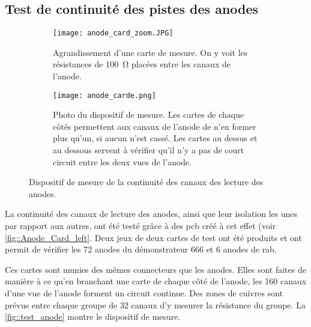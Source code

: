         \subsection{Test de continuité des pistes des anodes}\label{sec::test_anode}
            \begin{figure}
                \begin{subfigure}[t]{0.48\textwidth}
                    \texttt{[image: anode\_card\_zoom.JPG]}
                    \caption{Agrandissement d'une carte de mesure. On y voit les résistances de \SI{100}{\ohm} placées entre les canaux de l'anode.}
                    \label{fig::anode_card_zoom}
                \end{subfigure}
                \hfill
                \begin{subfigure}[t]{0.48\textwidth}
                    \texttt{[image: anode\_carde.png]}
                    \caption{Photo du dispositif de mesure. Les cartes de chaque côtés permettent aux  canaux de l'anode de n'en former plus qu'un, si aucun n'est cassé. Les cartes au dessus et au dessous servent à vérifier qu'il n'y a pas de court circuit entre les deux vues de l'anode.}
                    \label{fig::anode_card}
                \end{subfigure}
                \caption[Dispositif de mesure de la continuité des canaux des lecture des anodes.]{Dispositif de mesure de la continuité des canaux des lecture des anodes.}
                \label{fig::test_anode}
            \end{figure}
            La continuité des canaux de lecture des anodes, ainsi que leur isolation les unes par rapport aux autres, ont été testé grâce à des \gls{pcb} créé à cet effet (voir \autoref{fig::Anode_Card_left}. Deux jeux de deux cartes de test ont été produits et ont permit de vérifier les 72 anodes du démonstrateur 666 et 6 anodes de rab.
            
            Ces cartes sont munies des mêmes connecteurs que les anodes. Elles sont faites de manière à ce qu'en branchant une carte de chaque côté de l'anode, les 160 canaux d'une vue de l'anode forment un circuit continue. Des zones de cuivres sont prévus entre chaque groupe de 32 canaux d'y mesurer la résistance du groupe. La \autoref{fig::test_anode} montre le dispositif de mesure.

